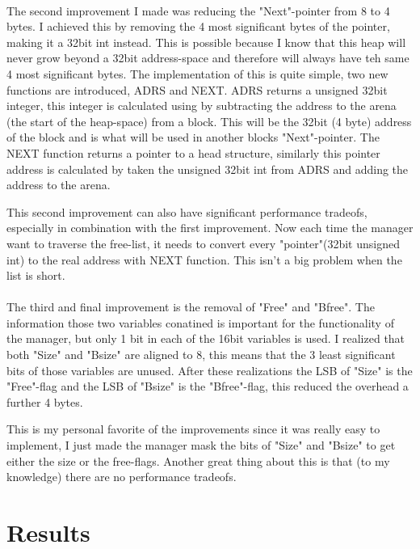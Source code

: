 \documentclass[11pt]{article}
\begin{document}
\paragraph{}
The second improvement I made was reducing the "Next"-pointer from 8 to 4 bytes. I achieved this by removing the 4 most significant bytes
of the pointer, making it a 32bit int instead. This is possible because I know that this heap will never grow beyond a 32bit address-space
and therefore will always have teh same 4 most significant bytes. The implementation of this is quite simple, two new functions are 
introduced, ADRS and NEXT. ADRS returns a unsigned 32bit integer, this integer is calculated using by subtracting the address to the arena
(the start of the heap-space) from a block. This will be the 32bit (4 byte) address of the block and is what will be used in another blocks
"Next"-pointer. The NEXT function returns a pointer to a head structure, similarly this pointer address is calculated by taken the 
unsigned 32bit int from ADRS and adding the address to the arena. 

This second improvement can also have significant performance tradeofs, especially in combination with the first improvement. Now each time
the manager want to traverse the free-list, it needs to convert every "pointer"(32bit unsigned int) to the real address with NEXT function.
This isn't a big problem when the list is short.

\paragraph{}
The third and final improvement is the removal of "Free" and "Bfree". The information those two variables conatined is important for the
functionality of the manager, but only 1 bit in each of the 16bit variables is used. I realized that both "Size" and "Bsize" are aligned 
to 8, this means that the 3 least significant bits of those variables are unused. After these realizations the LSB of "Size" is the 
"Free"-flag and the LSB of "Bsize" is the "Bfree"-flag, this reduced the overhead a further 4 bytes.

This is my personal favorite of the improvements since it was really easy to implement, I just made the manager mask the bits of "Size"
and "Bsize" to get either the size or the free-flags. Another great thing about this is that (to my knowledge) there are no performance
tradeofs.

\section{Results}
\end{document}
